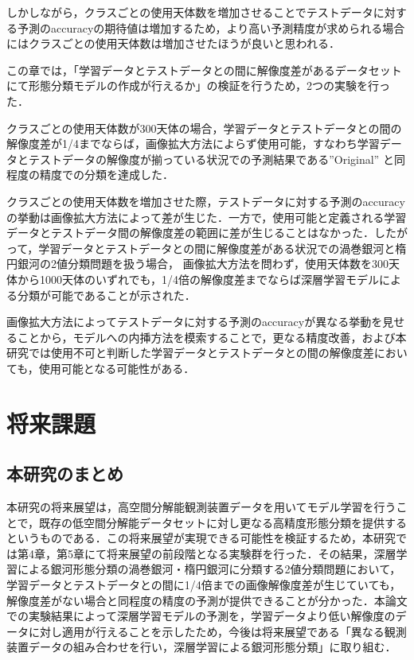 \documentclass[a4j, 11pt]{jreport}
\begin{document}
しかしながら，クラスごとの使用天体数を増加させることでテストデータに対する予測のaccuracyの期待値は増加するため，より高い予測精度が求められる場合にはクラスごとの使用天体数は増加させたほうが良いと思われる．

この章では，「学習データとテストデータとの間に解像度差があるデータセットにて形態分類モデルの作成が行えるか」の検証を行うため，2つの実験を行った．

クラスごとの使用天体数が300天体の場合，学習データとテストデータとの間の解像度差が1/4までならば，画像拡大方法によらず使用可能，すなわち学習データとテストデータの解像度が揃っている状況での予測結果である”Original” と同程度の精度での分類を達成した．

クラスごとの使用天体数を増加させた際，テストデータに対する予測のaccuracyの挙動は画像拡大方法によって差が生じた．一方で，使用可能と定義される学習データとテストデータ間の解像度差の範囲に差が生じることはなかった．したがって，学習データとテストデータとの間に解像度差がある状況での渦巻銀河と楕円銀河の2値分類問題を扱う場合，
画像拡大方法を問わず，使用天体数を300天体から1000天体のいずれでも，1/4倍の解像度差までならば深層学習モデルによる分類が可能であることが示された．

画像拡大方法によってテストデータに対する予測のaccuracyが異なる挙動を見せることから，モデルへの内挿方法を模索することで，更なる精度改善，および本研究では使用不可と判断した学習データとテストデータとの間の解像度差においても，使用可能となる可能性がある．

\newpage
\chapter{将来課題}
\section{本研究のまとめ}
本研究の将来展望は，高空間分解能観測装置データを用いてモデル学習を行うことで，既存の低空間分解能データセットに対し更なる高精度形態分類を提供するというものである．この将来展望が実現できる可能性を検証するため，本研究では第4章，第5章にて将来展望の前段階となる実験群を行った．その結果，深層学習による銀河形態分類の渦巻銀河・楕円銀河に分類する2値分類問題において，学習データとテストデータとの間に1/4倍までの画像解像度差が生じていても，解像度差がない場合と同程度の精度の予測が提供できることが分かった．本論文での実験結果によって深層学習モデルの予測を，学習データより低い解像度のデータに対し適用が行えることを示したため，今後は将来展望である「異なる観測装置データの組み合わせを行い，深層学習による銀河形態分類」に取り組む．
\end{document}
